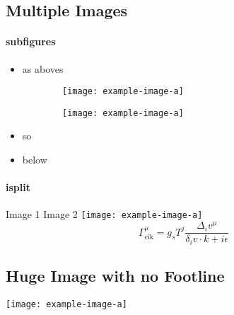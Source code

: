 \subsection{Multiple Images}

\begin{iframe}
    \framesubtitle{subfigures}
	\begin{itemize}
		\item as aboves
	\end{itemize}
	\begin{figure}
		\centering
		\begin{subfigure}[b]{0.49\textwidth}
		    \centering
		     \texttt{[image: example-image-a]}
		\end{subfigure}
		\hfill
		\centering
		\begin{subfigure}[b]{0.49\textwidth}
		    \centering
		     \texttt{[image: example-image-a]}
		\end{subfigure}   
	   \end{figure}
		\begin{itemize}
			\item so
			\item below 
		\end{itemize}
\end{iframe}

\begin{iframe}
\framesubtitle{isplit}
\centering
\hfill
\hfill
\hfill
Image 1
\hfill
\hfill
\hfill
Image 2
\hfill
{}
{
	\centering
    \texttt{[image: example-image-a]}
	\begin{equation*}
		\Gamma^\mu_\text{eik} = g_s T^j \frac{\Delta_i v^\mu}{\delta_i v \cdot k + i \epsilon}
	\end{equation*}
}
\end{iframe}

\begingroup
{}
\subsection{Huge Image with no Footline}
\begin{iframe}
    \centering
    \texttt{[image: example-image-a]}
\end{iframe}
\endgroup